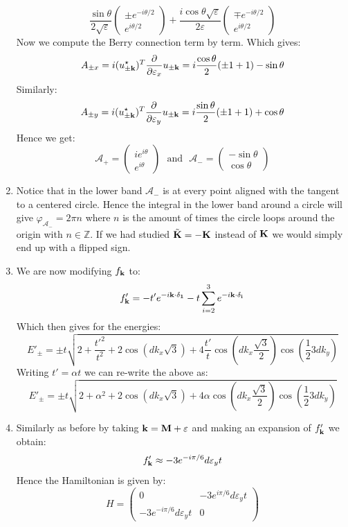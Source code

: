 \documentclass[10pt,a4paper]{article}
\begin{document}
\begin{enumerate}
\[\frac{\sin\theta}{2 \sqrt{\varepsilon}} \begin{pmatrix}
\pm e^{-i\theta/2}\\
e^{i\theta/2}
\end{pmatrix}
+ \frac{i \cos\theta \sqrt{\varepsilon}}{2\varepsilon}\begin{pmatrix}
\mp e^{-i\theta/2}\\
e^{i\theta/2}
\end{pmatrix}
\]
Now we compute the Berry connection term by term. Which gives:
\[
A_{\pm x} = i(u_{\pm \vb{k}}^\star)^T \pdv{}{\varepsilon_x} u_{\pm \vb{k}} = i\frac{\cos\theta}{2} (\pm 1 + 1) - \sin\theta
\]
Similarly:
\[
A_{\pm y} = i(u_{\pm \vb{k}}^\star)^T \pdv{}{\varepsilon_y} u_{\pm \vb{k}} = i\frac{\sin\theta}{2} (\pm 1 + 1) + \cos\theta
\]
Hence we get:
\[
\mathcal{A}_{+} = \begin{pmatrix}
i e^{i\theta}\\
e^{i\theta}
\end{pmatrix}
\mbox{~~and~~} \mathcal{A}_- = \begin{pmatrix}
-\sin \theta\\
\cos \theta
\end{pmatrix}
\]


\item Notice that in the lower band $\mathcal{A}_-$ is at every point aligned with the tangent to a centered circle. Hence the integral in the lower band around a circle will give $\varphi_{\mathcal{A}_-} = 2 \pi n$ where $n$ is the amount of times the circle loops around the origin with $n \in \mathbb{Z}$. If we had studied $\tilde{\vb{K}} = -\vb{K}$ instead of $\vb{K}$ we would simply end up with a flipped sign.

\item We are now modifying $f_{\vb{k}}$ to:
\[
f'_{\vb{k}} = - t' e^{-i \vb{k} \cdot \vb{\delta_1}} - t \sum_{i = 2}^3 e^{-i \vb{k} \cdot \vb{\delta_i}}
\]
Which then gives for the energies:
\[
E'_\pm = \pm t \sqrt{2 + \frac{t'^2}{t^2} + 2 \cos(d k_x \sqrt{3}) + 4 \frac{t'}{t} \cos(d k_x \frac{\sqrt{3}}{2}) \cos(\frac{1}{2}3 d k_y) }
\]
Writing $t' = \alpha t$ we can re-write the above as:
\[
E'_\pm = \pm t \sqrt{2 + \alpha^2 + 2 \cos(d k_x \sqrt{3}) + 4 \alpha \cos(d k_x \frac{\sqrt{3}}{2}) \cos(\frac{1}{2}3 d k_y) }
\]

\item Similarly as before by taking $\vb{k} = \vb{M} + \vb{\varepsilon}$ and making an expansion of $f'_{\vb{k}}$ we obtain:
\[
f'_{\vb{k}} \approx -3 e^{-i\pi/6} d \varepsilon_y t
\]
Hence the Hamiltonian is given by:
\[
H = \begin{pmatrix}
0 & -3 e^{i\pi/6} d \varepsilon_y t\\
-3 e^{-i\pi/6} d \varepsilon_y t & 0 
\end{pmatrix}
\]


\end{enumerate}
\end{document}
